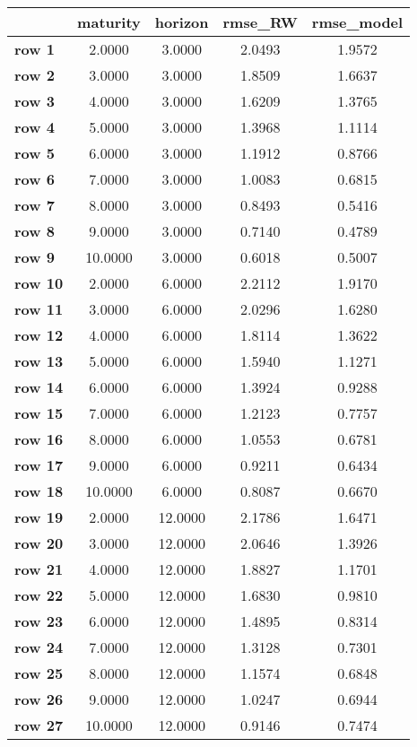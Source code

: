 \begin{tiny}\begin{tabular}{|l|c|c|c|c|}
\hline
&\textbf{maturity}&\textbf{horizon}&\textbf{rmse_RW}&\textbf{rmse_model}\\\hline
\textbf{row 1}&2.0000&3.0000&2.0493&1.9572\\\hline
\textbf{row 2}&3.0000&3.0000&1.8509&1.6637\\\hline
\textbf{row 3}&4.0000&3.0000&1.6209&1.3765\\\hline
\textbf{row 4}&5.0000&3.0000&1.3968&1.1114\\\hline
\textbf{row 5}&6.0000&3.0000&1.1912&0.8766\\\hline
\textbf{row 6}&7.0000&3.0000&1.0083&0.6815\\\hline
\textbf{row 7}&8.0000&3.0000&0.8493&0.5416\\\hline
\textbf{row 8}&9.0000&3.0000&0.7140&0.4789\\\hline
\textbf{row 9}&10.0000&3.0000&0.6018&0.5007\\\hline
\textbf{row 10}&2.0000&6.0000&2.2112&1.9170\\\hline
\textbf{row 11}&3.0000&6.0000&2.0296&1.6280\\\hline
\textbf{row 12}&4.0000&6.0000&1.8114&1.3622\\\hline
\textbf{row 13}&5.0000&6.0000&1.5940&1.1271\\\hline
\textbf{row 14}&6.0000&6.0000&1.3924&0.9288\\\hline
\textbf{row 15}&7.0000&6.0000&1.2123&0.7757\\\hline
\textbf{row 16}&8.0000&6.0000&1.0553&0.6781\\\hline
\textbf{row 17}&9.0000&6.0000&0.9211&0.6434\\\hline
\textbf{row 18}&10.0000&6.0000&0.8087&0.6670\\\hline
\textbf{row 19}&2.0000&12.0000&2.1786&1.6471\\\hline
\textbf{row 20}&3.0000&12.0000&2.0646&1.3926\\\hline
\textbf{row 21}&4.0000&12.0000&1.8827&1.1701\\\hline
\textbf{row 22}&5.0000&12.0000&1.6830&0.9810\\\hline
\textbf{row 23}&6.0000&12.0000&1.4895&0.8314\\\hline
\textbf{row 24}&7.0000&12.0000&1.3128&0.7301\\\hline
\textbf{row 25}&8.0000&12.0000&1.1574&0.6848\\\hline
\textbf{row 26}&9.0000&12.0000&1.0247&0.6944\\\hline
\textbf{row 27}&10.0000&12.0000&0.9146&0.7474\\\hline
\end{tabular}
\end{tiny}